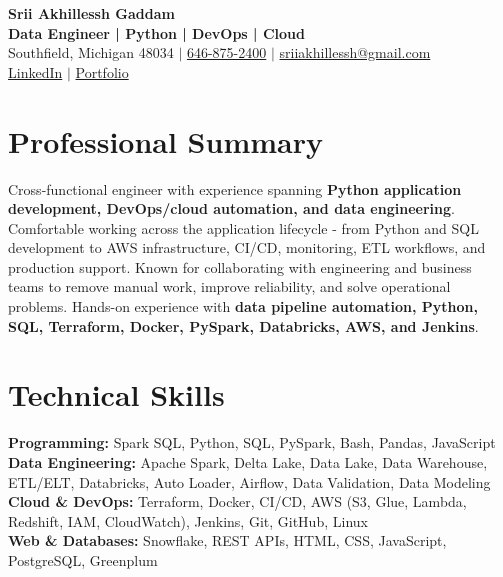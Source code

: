 \documentclass[letterpaper,10pt]{article}
\begin{document}
\fontsize{9.35pt}{10.45pt}\selectfont

\begin{center}
    {\LARGE \textbf{Srii Akhillessh Gaddam}} \\[-1pt]
    \textbf{Data Engineer | Python | DevOps | Cloud} \\[2pt]
    Southfield, Michigan 48034 $|$
    \href{tel:6468752400}{646-875-2400} $|$
    \href{mailto:sriiakhillessh@gmail.com}{sriiakhillessh@gmail.com} \\[1pt]
    \href{https://www.linkedin.com/in/srii-akhiilessh-gaddam-b48668191/}{LinkedIn} $|$
    \href{https://sriiakhillesshg.github.io/portfolio/}{Portfolio}
\end{center}
\vspace{-8pt}

\section{Professional Summary}
\small{Cross-functional engineer with experience spanning \textbf{Python application development, DevOps/cloud automation, and data engineering}. Comfortable working across the application lifecycle - from Python and SQL development to AWS infrastructure, CI/CD, monitoring, ETL workflows, and production support. Known for collaborating with engineering and business teams to remove manual work, improve reliability, and solve operational problems. Hands-on experience with \textbf{data pipeline automation, Python, SQL, Terraform, Docker, PySpark, Databricks, AWS, and Jenkins}.}

\section{Technical Skills}
\small{
\textbf{Programming:} Spark SQL, Python, SQL, PySpark, Bash, Pandas, JavaScript \\
\textbf{Data Engineering:} Apache Spark, Delta Lake, Data Lake, Data Warehouse, ETL/ELT, Databricks, Auto Loader, Airflow, Data Validation, Data Modeling \\
\textbf{Cloud \& DevOps:} Terraform, Docker, CI/CD, AWS (S3, Glue, Lambda, Redshift, IAM, CloudWatch), Jenkins, Git, GitHub, Linux \\
\textbf{Web \& Databases:} Snowflake, REST APIs, HTML, CSS, JavaScript, PostgreSQL, Greenplum
}
\end{document}
